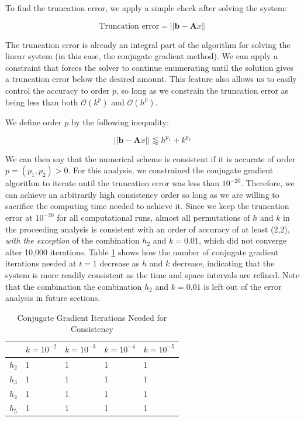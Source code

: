 \documentclass[12pt]{article}
\begin{document}
\noindent To find the truncation error, we apply a simple check after solving the system:

\begin{equation}\label{norm}
	\text{Truncation error} = ||\textbf{b}-\textbf{A}x|| 
\end{equation}

The truncation error is already an integral part of the algorithm for solving the linear system (in this case, the conjugate gradient method). We can apply a constraint that forces the solver to continue enumerating until the solution gives a truncation error below the desired amount. This feature also allows us to easily control the accuracy to order $p$, so long as we constrain the truncation error as being less than both $\mathcal{O}(k^p)$ and $\mathcal{O}(h^p)$. 

We define order $p$ by the following inequality:

\begin{equation}
	||\textbf{b}-\textbf{A}x|| \lessapprox h^{p_1}+k^{p_2}
\end{equation}

We can then say that the numerical scheme is consistent if it is accurate of order $p=(p_1,p_2)>0$. For this analysis, we constrained the conjugate gradient algorithm to iterate until the truncation error was less than $10^{-20}$. Therefore, we can achieve an arbitrarily high consistency order so long as we are willing to sacrifice the computing time needed to achieve it. Since we keep the truncation error at $10^{-20}$ for all computational runs, almost all permutations of $h$ and $k$ in the proceeding analysis is consistent with an order of accuracy of at least (2,2), \textit{with the exception} of the combination $h_2$ and $k=0.01$, which did not converge after 10,000 iterations. Table \ref{tab:consistency} shows how the number of conjugate gradient iterations needed at $t=1$ decrease as $h$ and $k$ decrease, indicating that the system is more readily consistent as the time and space intervals are refined. Note that the combination the combination $h_2$ and $k=0.01$ is left out of the error analysis in future sections.


\begin{table}[H]
	\centering
	\caption{Conjugate Gradient Iterations Needed for Consistency}\label{tab:consistency}
	\begin{tabular}{|l|l|l|l|l|}
		\hline
		& $k=10^{-2}$ & $k=10^{-3}$ & $k=10^{-4}$ & $k=10^{-5}$ \\ \hline
		$h_2$ & 1           & 1           & 1           & 1           \\ \hline
		$h_3$ & 1           & 1           & 1           & 1           \\ \hline
		$h_4$ & 1           & 1           & 1           & 1           \\ \hline
		$h_5$ & 1           & 1           & 1           & 1           \\ \hline
	\end{tabular}
\end{table}
\end{document}
